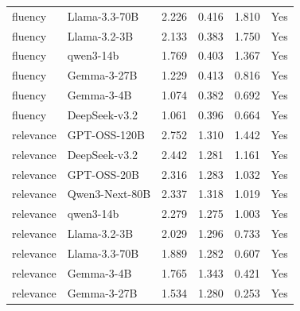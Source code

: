 \begin{table}[t]
{\begin{tabular}{llrrrl}
fluency & Llama-3.3-70B & 2.226 & 0.416 & 1.810 & Yes \\
fluency & Llama-3.2-3B & 2.133 & 0.383 & 1.750 & Yes \\
fluency & qwen3-14b & 1.769 & 0.403 & 1.367 & Yes \\
fluency & Gemma-3-27B & 1.229 & 0.413 & 0.816 & Yes \\
fluency & Gemma-3-4B & 1.074 & 0.382 & 0.692 & Yes \\
fluency & DeepSeek-v3.2 & 1.061 & 0.396 & 0.664 & Yes \\
relevance & GPT-OSS-120B & 2.752 & 1.310 & 1.442 & Yes \\
relevance & DeepSeek-v3.2 & 2.442 & 1.281 & 1.161 & Yes \\
relevance & GPT-OSS-20B & 2.316 & 1.283 & 1.032 & Yes \\
relevance & Qwen3-Next-80B & 2.337 & 1.318 & 1.019 & Yes \\
relevance & qwen3-14b & 2.279 & 1.275 & 1.003 & Yes \\
relevance & Llama-3.2-3B & 2.029 & 1.296 & 0.733 & Yes \\
relevance & Llama-3.3-70B & 1.889 & 1.282 & 0.607 & Yes \\
relevance & Gemma-3-4B & 1.765 & 1.343 & 0.421 & Yes \\
relevance & Gemma-3-27B & 1.534 & 1.280 & 0.253 & Yes \\
\bottomrule
\end{tabular}
}
\end{table}